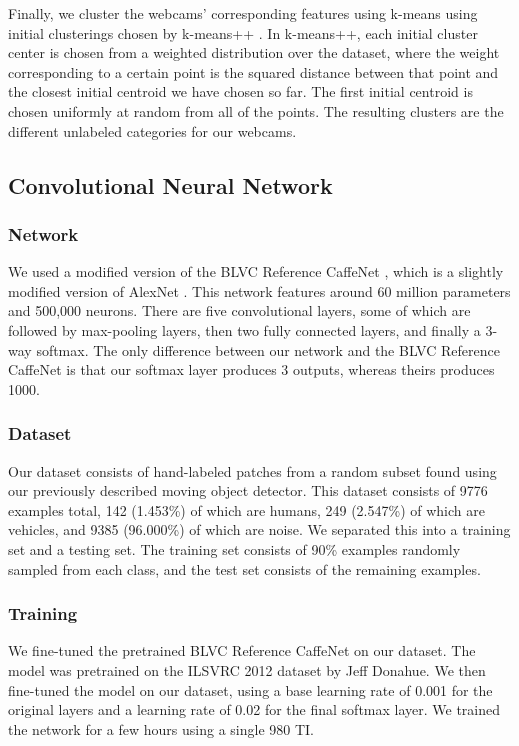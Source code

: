 \documentclass[10pt]{article} %
\begin{document}
Finally, we cluster the webcams' corresponding features using k-means using
initial clusterings chosen by k-means++ \cite{kmeans}. In k-means++, each initial cluster
center is chosen from a weighted distribution over the dataset, where the
weight corresponding to a certain point is the squared distance between that
point and the closest initial centroid we have chosen so far. The first initial
centroid is chosen uniformly at random from all of the points. The resulting
clusters are the different unlabeled categories for our webcams.

\subsection{Convolutional Neural Network}
\subsubsection{Network}
We used a modified version of the BLVC Reference CaffeNet \cite{caffenet}, which is a slightly
modified version of AlexNet \cite{krizhevsky}. This network features around 60
million parameters and 500,000 neurons. There are five convolutional layers,
some of which are followed by max-pooling layers, then two fully connected
layers, and finally a 3-way softmax.  The only difference between our network
and the BLVC Reference CaffeNet is that our softmax layer produces 3 outputs,
whereas theirs produces 1000.
\subsubsection{Dataset}
Our dataset consists of hand-labeled patches from a random subset found using
our previously described moving object detector. This dataset consists of 9776
examples total, 142 (1.453\%) of which are humans, 249 (2.547\%) of which are
vehicles, and 9385 (96.000\%) of which are noise. We separated this into a
training set and a testing set. The training set consists of 90\% examples
randomly sampled from each class, and the test set consists of the remaining
examples.
\subsubsection{Training}
We fine-tuned the pretrained BLVC Reference CaffeNet on our dataset. The model
was pretrained on the ILSVRC 2012 dataset by Jeff Donahue. We then fine-tuned
the model on our dataset, using a base learning rate of 0.001 for the original
layers and a learning rate of 0.02 for the final softmax layer. We
trained the network for a few hours using a single 980 TI.
\end{document}

